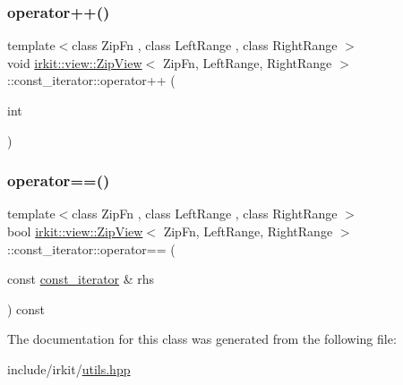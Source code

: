 \subsubsection{\texorpdfstring{operator++()}{operator++()}\hspace{0.1cm}{\footnotesize\ttfamily [2/2]}}
{\footnotesize\ttfamily template$<$class Zip\+Fn , class Left\+Range , class Right\+Range $>$ \\
void \hyperlink{classirkit_1_1view_1_1ZipView}{irkit\+::view\+::\+Zip\+View}$<$ Zip\+Fn, Left\+Range, Right\+Range $>$\+::const\+\_\+iterator\+::operator++ (\begin{DoxyParamCaption}\item[{int}]{ }\end{DoxyParamCaption})\hspace{0.3cm}{\ttfamily [inline]}}

\mbox{\label{classirkit_1_1view_1_1ZipView_1_1const__iterator_a7cd1982ce6b7a658c69eca8ec3b211c1}} 
\subsubsection{\texorpdfstring{operator==()}{operator==()}}
{\footnotesize\ttfamily template$<$class Zip\+Fn , class Left\+Range , class Right\+Range $>$ \\
bool \hyperlink{classirkit_1_1view_1_1ZipView}{irkit\+::view\+::\+Zip\+View}$<$ Zip\+Fn, Left\+Range, Right\+Range $>$\+::const\+\_\+iterator\+::operator== (\begin{DoxyParamCaption}\item[{const \hyperlink{classirkit_1_1view_1_1ZipView_1_1const__iterator}{const\+\_\+iterator} \&}]{rhs }\end{DoxyParamCaption}) const\hspace{0.3cm}{\ttfamily [inline]}}



The documentation for this class was generated from the following file\+:\begin{DoxyCompactItemize}
\item 
include/irkit/\hyperlink{utils_8hpp}{utils.\+hpp}\end{DoxyCompactItemize}
